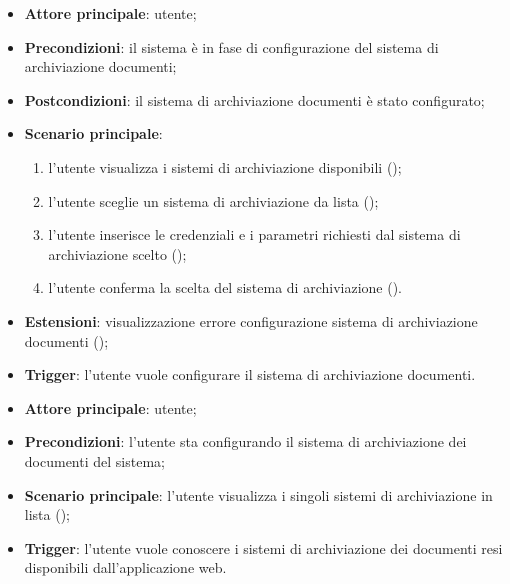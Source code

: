 \documentclass[10pt, a4paper]{article}
\begin{document}
    \begin{itemize}
        \item \textbf{Attore principale}: utente;
        \item \textbf{Precondizioni}:  il sistema è in fase di configurazione del sistema di archiviazione documenti;
        \item \textbf{Postcondizioni}: il sistema di archiviazione documenti è stato configurato;
        \item \textbf{Scenario principale}:
            \begin{enumerate}
                \item l’utente visualizza i sistemi di archiviazione disponibili ();
                \item l’utente sceglie un sistema di archiviazione da lista ();
                \item l’utente inserisce le credenziali e i parametri richiesti dal sistema di archiviazione scelto ();
                \item l’utente conferma la scelta del sistema di archiviazione ().
            \end{enumerate}
        \item \textbf{Estensioni}: visualizzazione errore configurazione sistema di archiviazione documenti ();
        \item \textbf{Trigger}: l’utente vuole configurare il sistema di archiviazione documenti.
    \end{itemize}

    \begin{itemize}
        \item \textbf{Attore principale}: utente;
        \item \textbf{Precondizioni}: l’utente sta configurando il sistema di archiviazione dei documenti del sistema;
        \item \textbf{Scenario principale}: l’utente visualizza i singoli sistemi di archiviazione in lista ();
        \item \textbf{Trigger}: l’utente vuole conoscere i sistemi di archiviazione dei documenti resi disponibili dall’applicazione web.
    \end{itemize}
\end{document}
